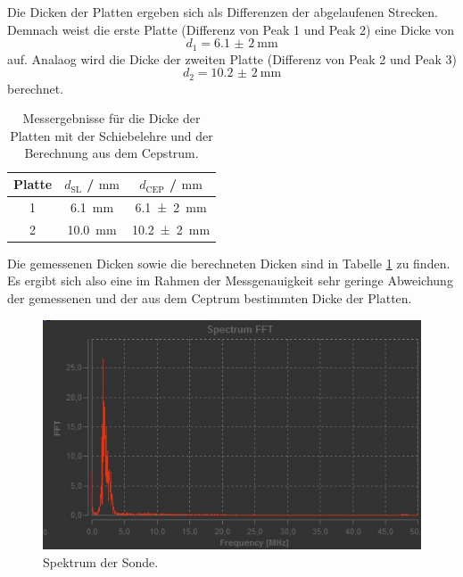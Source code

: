 Die Dicken der Platten ergeben sich als Differenzen der abgelaufenen Strecken.
Demnach weist die erste Platte (Differenz von Peak 1 und Peak 2) eine Dicke von
\begin{equation*}
	d_1 = \SI{6,1(2)}{\milli\meter}
\end{equation*}
auf.
Analaog wird die Dicke der zweiten Platte (Differenz von Peak 2 und Peak 3)
\begin{equation*}
	d_2 = \SI{10,2(2)}{\milli\meter}
\end{equation*}
berechnet.
\begin{table}
\centering
	\caption{Messergebnisse für die Dicke der Platten mit der Schiebelehre und der Berechnung aus dem Cepstrum.}
\label{tab:ceperg}
	\begin{tabular}{ccc}
	\toprule
		Platte & $d_{\mathrm{SL}}$ / $\si{\milli\meter}$ & $d_{\mathrm{CEP}}$ / $\si{\milli\meter}$ \\
	\midrule
		1 & \SI{6,1}{\milli\meter} & \SI{6,1(2)}{\milli\meter} \\
		2 & \SI{10,0}{\milli\meter} & \SI{10,2(2)}{\milli\meter} \\
	\bottomrule
	\end{tabular}
\end{table}
Die gemessenen Dicken sowie die berechneten Dicken sind in Tabelle \ref{tab:ceperg} zu finden.
Es ergibt sich also eine im Rahmen der Messgenauigkeit sehr geringe Abweichung der gemessenen
und der aus dem Ceptrum bestimmten Dicke der Platten.
\begin{figure}
  \centering
  \includegraphics[width=\textwidth]{Messdaten/fft.jpg}
  \caption{Spektrum der Sonde.}
  \label{fig:spektrum}
\end{figure}

\FloatBarrier
